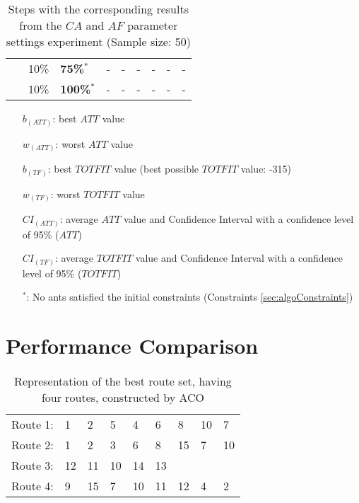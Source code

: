 \begin{sidewaystable}
\begin{tabular}{|l|l|l||c|c|c|c|c|c|}
    ~ & 10\% &\textbf{75\%$^*$} & - & - & - & - & - & - \\
    ~ & 10\% &\textbf{100\%$^*$} & - & - & - & - & - & - \\
    \hline
    \end{tabular}
    \caption {Steps with the corresponding results from the $CA$ and $AF$ parameter settings experiment (Sample size: 50)}
    \tiny
    \begin{itemize}[noitemsep]
    \item[$b_{(ATT)}$:] best $ATT$ value
    \item[$w_{(ATT)}$:] worst $ATT$ value
    \item[$b_{(TF)}$:] best $TOTFIT$ value (best possible $TOTFIT$ value: -315)
    \item[$w_{(TF)}$:] worst $TOTFIT$ value
    \item[$CI_{(ATT)}$:] average $ATT$ value and Confidence Interval with a confidence level of 95\% ($ATT$)
    \item[$CI_{(TF)}$:] average $TOTFIT$ value and Confidence Interval with a confidence level of 95\% ($TOTFIT$)
    \item[$^*$:] No ants satisfied the initial constraints (Constraints \vref{sec:algoConstraints})
    \end{itemize}
    \label{table:pm2}
\end{sidewaystable}


\section{Performance Comparison}

\begin{table}[H]
    \centering
    \begin{tabular}{|l|llllllll|}
    \hline
    Route 1: & 1 & 2 & 5 & 4 & 6 & 8 & 10 & 7 \\
    Route 2: & 1 & 2 & 3 & 6 & 8 & 15 & 7 & 10 \\
    Route 3: & 12 & 11 & 10 & 14 & 13 &  &  & \\
    Route 4: & 9 & 15 & 7 & 10 & 11 & 12 & 4 & 2 \\
    \hline
    \end{tabular}
    \caption {Representation of the best route set, having four routes, constructed by ACO}
    \label{table:performanceComparison_bestRouteSet4_ACO}
\end{table}

